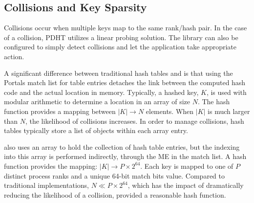 \subsection{Collisions and Key Sparsity}

Collisions occur when multiple keys map to the same rank/hash pair.
In the case of a collision,
PDHT utilizes a linear probing solution. The library can
also be configured to simply detect collisions and let the application
take appropriate action. 

A significant difference between traditional hash tables and \pdht is
that using the Portals match list for table entries detaches the link
between the computed hash code and the actual location in
memory. Typically, a hashed key, $K$,  is used with modular arithmetic to
determine a location in an array of size $N$. The hash function
provides a mapping between $|K| \rightarrow N$ elements. When $|K|$ is
much larger than $N$, the likelihood of collisions increases. In order
to manage collisions, hash tables typically store a list of objects within
each array entry.

\pdht also uses an array to hold the collection of hash table
entries, but the indexing into this array is performed indirectly,
through the ME in the match list. A \pdht hash function provides the 
mapping: $|K| \rightarrow P \times 2^{64}$. Each key is mapped to one
of $P$ distinct process ranks and a unique 64-bit match bits
value. Compared to traditional implementations, $N \ll  P \times
2^{64}$, which has the impact of dramatically reducing the likelihood
of a collision, provided a reasonable hash function.


